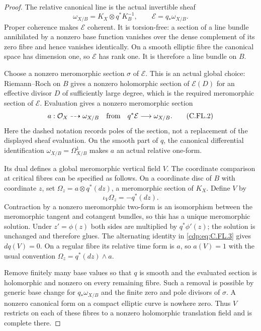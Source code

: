 \begin{proof}
The relative canonical line is the actual invertible
sheaf
\[
 \omega_{X/B}=K_X\otimes q^*K_B^{-1},
 \qquad \mathcal E=q_*\omega_{X/B}.
                                                               \tag{C.FL.1}\label{cdp:eq:C.FL.1}
\]
Proper coherence makes $\mathcal E$ coherent. It is
torsion-free: a section of a line bundle annihilated
by a nonzero base function vanishes over the dense
complement of its zero fibre and hence vanishes
identically. On a smooth elliptic fibre the canonical
space has dimension one, so $\mathcal E$ has rank one.
It is therefore a line bundle on $B$.

Choose a nonzero meromorphic section $\sigma$ of
$\mathcal E$. This is an actual global choice:
Riemann--Roch on $B$ gives a nonzero holomorphic
section of $\mathcal E(D)$ for an effective divisor
$D$ of sufficiently large degree, which is the
required meromorphic section of $\mathcal E$.
Evaluation gives a nonzero meromorphic section
\[
 a:\mathcal O_X\dashrightarrow\omega_{X/B}
       \quad\hbox{from}\quad q^*\mathcal E\longrightarrow
                                      \omega_{X/B}.
                                                               \tag{C.FL.2}\label{cdp:eq:C.FL.2}
\]
Here the dashed notation records poles of the section,
not a replacement of the displayed sheaf evaluation.
On the smooth part of $q$, the canonical differential
identification $\omega_{X/B}=\Omega^1_{X/B}$ makes
$a$ an actual relative one-form.

Its dual defines a global meromorphic vertical field
$V$. The coordinate comparison at critical fibres
can be specified as follows. On a coordinate disc
of $B$ with coordinate $z$, set
$\Omega_z=a\otimes q^*(dz)$, a meromorphic section
of $K_X$. Define $V$ by
\[
                   \iota_V\Omega_z=-q^*(dz).
                                                               \tag{C.FL.3}\label{cdp:eq:C.FL.3}
\]
Contraction by a nonzero meromorphic two-form is an
isomorphism between the meromorphic tangent and
cotangent bundles, so this has a unique meromorphic
solution. Under $z'=\phi(z)$ both sides are multiplied
by $q^*\phi'(z)$; the solution is unchanged and
therefore glues. The alternating identity in
\eqref{cdp:eq:C.FL.3} gives $dq(V)=0$. On a regular fibre its
relative time form is $a$, so $a(V)=1$ with the
usual convention $\Omega_z=q^*(dz)\wedge a$.

Remove finitely many base values so that $q$ is
smooth and the evaluated section is holomorphic
and nonzero on every remaining fibre. Such a
removal is possible by generic base change for
$q_*\omega_{X/B}$ and the finite zero and pole
divisors of $\sigma$. A nonzero canonical form
on a compact elliptic curve is nowhere zero.
Thus $V$ restricts on each of these fibres to
a nonzero holomorphic translation field and is
complete there.


\end{proof}
